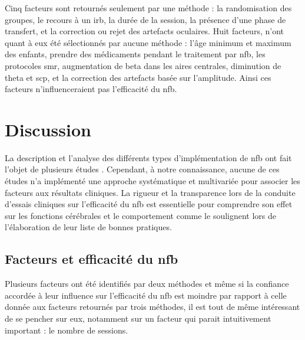 Cinq facteurs sont retournés seulement par une méthode : la randomisation des groupes, le recours à un \gls{irb}, la durée de la session, la présence d'une phase de transfert,
et la correction ou rejet des artefacts oculaires. Huit facteurs, n'ont quant à eux été sélectionnés par aucune méthode : l'âge minimum et maximum des enfants, prendre des 
médicaments pendant le traitement par \gls{nfb}, les protocoles \gls{smr}, augmentation de beta dans les aires centrales, diminution de theta et \gls{scp}, et la correction
des artefacts basée sur l'amplitude. Ainsi ces facteurs n'influenceraient pas l'efficacité du \gls{nfb}. 

\section{Discussion}

La description et l'analyse des différents types d'implémentation de \gls{nfb} ont fait l'objet de plusieurs études \citep{Arns2014, 
Jeunet2018, Arns2009, Cortese2016}. Cependant, à notre connaissance, aucune de ces études n'a implémenté une approche systématique et 
multivariée pour associer les facteurs aux résultats cliniques. La rigueur et la transparence lors de la conduite d'essais cliniques sur l'efficacité
du \gls{nfb} est essentielle pour comprendre son effet sur les fonctions cérébrales et le comportement comme le soulignent \citet{Ros2019} lors de l'élaboration
de leur liste de bonnes pratiques. 

\subsection{Facteurs et efficacité du \gls{nfb}}

Plusieurs facteurs ont été identifiés par deux méthodes et même si la confiance accordée à leur influence sur l'efficacité du \gls{nfb} est moindre par rapport
à celle donnée aux facteurs retournés par trois méthodes, il est tout de même intéressant de se pencher sur eux, notamment sur un facteur qui 
parait intuitivement important : le nombre de sessions.

